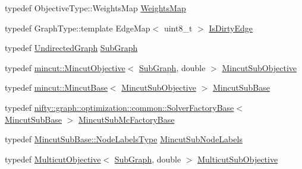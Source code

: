 \begin{DoxyCompactItemize}
typedef Objective\+Type\+::\+Weights\+Map \hyperlink{classnifty_1_1graph_1_1optimization_1_1multicut_1_1Cgc_a6d3ba8605fd7c111fca7a9f79ca09c32}{Weights\+Map}
\item 
typedef Graph\+Type\+::template Edge\+Map$<$ uint8\+\_\+t $>$ \hyperlink{classnifty_1_1graph_1_1optimization_1_1multicut_1_1Cgc_a9aab1ca56069c4f2801a35bf05620465}{Is\+Dirty\+Edge}
\item 
typedef \hyperlink{classnifty_1_1graph_1_1UndirectedGraph}{Undirected\+Graph} \hyperlink{classnifty_1_1graph_1_1optimization_1_1multicut_1_1Cgc_a477a719159f23300cd8e627a825e9275}{Sub\+Graph}
\item 
typedef \hyperlink{classnifty_1_1graph_1_1optimization_1_1mincut_1_1MincutObjective}{mincut\+::\+Mincut\+Objective}$<$ \hyperlink{classnifty_1_1graph_1_1optimization_1_1multicut_1_1Cgc_a477a719159f23300cd8e627a825e9275}{Sub\+Graph}, double $>$ \hyperlink{classnifty_1_1graph_1_1optimization_1_1multicut_1_1Cgc_a3a662b7fd59d4ba56da98b359c47d63c}{Mincut\+Sub\+Objective}
\item 
typedef \hyperlink{classnifty_1_1graph_1_1optimization_1_1mincut_1_1MincutBase}{mincut\+::\+Mincut\+Base}$<$ \hyperlink{classnifty_1_1graph_1_1optimization_1_1multicut_1_1Cgc_a3a662b7fd59d4ba56da98b359c47d63c}{Mincut\+Sub\+Objective} $>$ \hyperlink{classnifty_1_1graph_1_1optimization_1_1multicut_1_1Cgc_aa4e8e89c78edc941bdb1b9331c81395d}{Mincut\+Sub\+Base}
\item 
typedef \hyperlink{classnifty_1_1graph_1_1optimization_1_1common_1_1SolverFactoryBase}{nifty\+::graph\+::optimization\+::common\+::\+Solver\+Factory\+Base}$<$ \hyperlink{classnifty_1_1graph_1_1optimization_1_1multicut_1_1Cgc_aa4e8e89c78edc941bdb1b9331c81395d}{Mincut\+Sub\+Base} $>$ \hyperlink{classnifty_1_1graph_1_1optimization_1_1multicut_1_1Cgc_a104f55e83ebbaf6451d0260210f0c7dc}{Mincut\+Sub\+Mc\+Factory\+Base}
\item 
typedef \hyperlink{classnifty_1_1graph_1_1optimization_1_1common_1_1SolverBase_a6e4e465f3b6e039882669fcfb9714818}{Mincut\+Sub\+Base\+::\+Node\+Labels\+Type} \hyperlink{classnifty_1_1graph_1_1optimization_1_1multicut_1_1Cgc_a068e52c9f641116d85685d4ce70f418b}{Mincut\+Sub\+Node\+Labels}
\item 
typedef \hyperlink{classnifty_1_1graph_1_1optimization_1_1multicut_1_1MulticutObjective}{Multicut\+Objective}$<$ \hyperlink{classnifty_1_1graph_1_1optimization_1_1multicut_1_1Cgc_a477a719159f23300cd8e627a825e9275}{Sub\+Graph}, double $>$ \hyperlink{classnifty_1_1graph_1_1optimization_1_1multicut_1_1Cgc_a437e2332f586cdb3f4ee55e3cf1ea224}{Multicut\+Sub\+Objective}

\end{DoxyCompactItemize}
